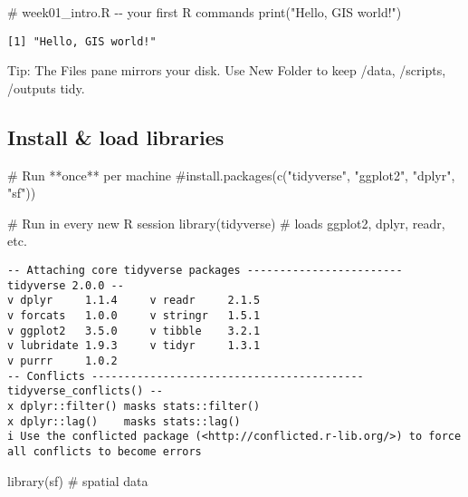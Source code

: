 \documentclass[
  letterpaper,
  DIV=11,
  numbers=noendperiod]{scrreprt}
\newenvironment{Shaded}{\begin{snugshade}}{\end{snugshade}}
\newcommand{\CommentTok}[1]{\textcolor[rgb]{0.37,0.37,0.37}{#1}}
\newcommand{\FunctionTok}[1]{\textcolor[rgb]{0.28,0.35,0.67}{#1}}
\newcommand{\NormalTok}[1]{\textcolor[rgb]{0.00,0.23,0.31}{#1}}
\newcommand{\StringTok}[1]{\textcolor[rgb]{0.13,0.47,0.30}{#1}}
\begin{document}
\begin{Shaded}
\begin{Highlighting}[]
\CommentTok{\# week01\_intro.R  {-}{-} your first R commands}
\FunctionTok{print}\NormalTok{(}\StringTok{"Hello, GIS world!"}\NormalTok{)}
\end{Highlighting}
\end{Shaded}

\begin{verbatim}
[1] "Hello, GIS world!"
\end{verbatim}

Tip: The Files pane mirrors your disk. Use New Folder to keep /data,
/scripts, /outputs tidy.

\hypertarget{install-load-libraries}{%
\subsection{Install \& load libraries}\label{install-load-libraries}}

\begin{Shaded}
\begin{Highlighting}[]
\CommentTok{\# Run **once** per machine}
\CommentTok{\#install.packages(c("tidyverse", "ggplot2", "dplyr", "sf"))}
\end{Highlighting}
\end{Shaded}

\begin{Shaded}
\begin{Highlighting}[]
\CommentTok{\# Run in every new R session}
\FunctionTok{library}\NormalTok{(tidyverse)   }\CommentTok{\# loads ggplot2, dplyr, readr, etc.}
\end{Highlighting}
\end{Shaded}

\begin{verbatim}
-- Attaching core tidyverse packages ------------------------ tidyverse 2.0.0 --
v dplyr     1.1.4     v readr     2.1.5
v forcats   1.0.0     v stringr   1.5.1
v ggplot2   3.5.0     v tibble    3.2.1
v lubridate 1.9.3     v tidyr     1.3.1
v purrr     1.0.2     
-- Conflicts ------------------------------------------ tidyverse_conflicts() --
x dplyr::filter() masks stats::filter()
x dplyr::lag()    masks stats::lag()
i Use the conflicted package (<http://conflicted.r-lib.org/>) to force all conflicts to become errors
\end{verbatim}

\begin{Shaded}
\begin{Highlighting}[]
\FunctionTok{library}\NormalTok{(sf)          }\CommentTok{\# spatial data}
\end{Highlighting}
\end{Shaded}
\end{document}
